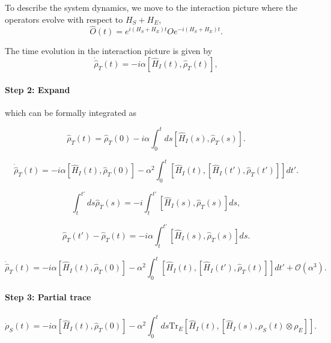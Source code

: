 To describe the system dynamics, we move to the interaction picture where the operators evolve with respect to $H_S + H_E$,
\begin{equation}
    \hat{O}(t) = e^{i(H_S+H_E)t} O e^{-i(H_S+H_E)t}.
\end{equation}

The time evolution in the interaction picture is given by
\begin{equation}
    \dot{\hat{\rho}}_T(t) = -i \alpha [\hat{H}_I(t), \hat{\rho}_T(t)],
\end{equation}

\paragraph{Step 2: Expand}
which can be formally integrated as

\begin{equation}
    \hat{\rho}_T(t) = \hat{\rho}_T(0) - i \alpha \int_0^t ds [\hat{H}_I(s), \hat{\rho}_T(s)].
\end{equation}

\begin{equation}
    \dot{\hat{\rho}}_T(t) = -i \alpha \left[ \hat{H}_I(t), \hat{\rho}_T(0) \right] - \alpha^2 \int_0^t \left[ \hat{H}_I(t), \left[ \hat{H}_I(t'), \hat{\rho}_T(t') \right] \right] dt'.
\end{equation}

\begin{equation}
    \int_t^{t'} d s \hat{\rho}_T(s) = -i \int_t^{t'} \left[ \hat{H}_I(s), \hat{\rho}_T(s) \right] ds,
\end{equation}

\begin{equation}
    \hat{\rho}_T(t') - \hat{\rho}_T(t) = -i \alpha \int_t^{t'} \left[ \hat{H}_I(s), \hat{\rho}_T(s) \right] ds.
\end{equation}

\begin{equation}
    \dot{\hat{\rho}}_T(t) = -i \alpha \left[ \hat{H}_I(t), \hat{\rho}_T(0) \right] 
    - \alpha^2 \int_0^t \left[ \hat{H}_I(t), \left[ \hat{H}_I(t'), \hat{\rho}_T(t) \right] \right] dt' + \mathcal{O} (\alpha^3).
\end{equation}

\paragraph{Step 3: Partial trace}

\begin{equation}
    \dot{\rho}_S(t) = -i \alpha [\hat{H}_I(t),\hat{\rho}_T(0)]  - \alpha^2 \int_0^t ds \mathrm{Tr}_E [\hat{H}_I(t), [\hat{H}_I(s), \rho_S(t) \otimes \rho_E]].
\end{equation}

